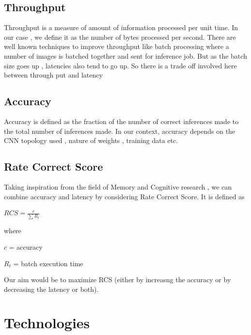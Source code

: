 \documentclass[titlepage]{report}
\begin{document}
\section{Throughput}
Throughput is  a measure of amount of information processed per unit time. In our case , we define it as the number of bytes processed per second.
There are well known techniques to improve throughput like batch processing where a number of images is batched together and sent for inference job.
But as the batch size goes up , latencies also tend to go up. So there is a trade off involved here between through put and latency

\section{Accuracy}
Accuracy is defined as the fraction of the number of correct inferences made to the total number of inferences made.
In our context, accuracy depends on the CNN topology used , nature of weights , training data etc.


\section{Rate Correct Score}
Taking inspiration from the field of Memory and  Cognitive research , we can combine accuracy and latency by considering Rate Correct Score. It is defined as    

$RCS = \frac{c}{\sum R_t}$    

where   

$c$ = accuracy    

      $R_t$ = batch execution time  
      
Our aim would be to maximize RCS (either by increasng the accuracy or by decreasing the latency or both).




\chapter{Technologies}
\end{document}
